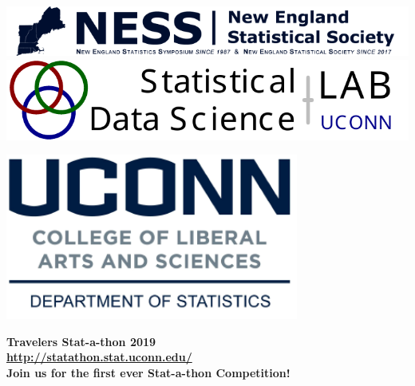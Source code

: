 \documentclass[12pt]{article}
\begin{document}
\pagestyle{empty}


\noindent
\begin{minipage}[m]{4in}
\includegraphics[width=\linewidth]{ness-banner}
\includegraphics[width=\linewidth]{tricircle}
\end{minipage}
\hfill
\begin{minipage}[m]{2.5in}
\includegraphics[width=\linewidth]{uconnstat-logo}
\end{minipage}

\bigskip

\begin{center}
  {\bf\Huge Travelers Stat-a-thon 2019}\\[1ex]
  {\bf\large \url{http://statathon.stat.uconn.edu/}}\\[1ex]
  {\bf\large  Join us for the first ever Stat-a-thon Competition!}
\end{center}

\vfill
\end{document}
